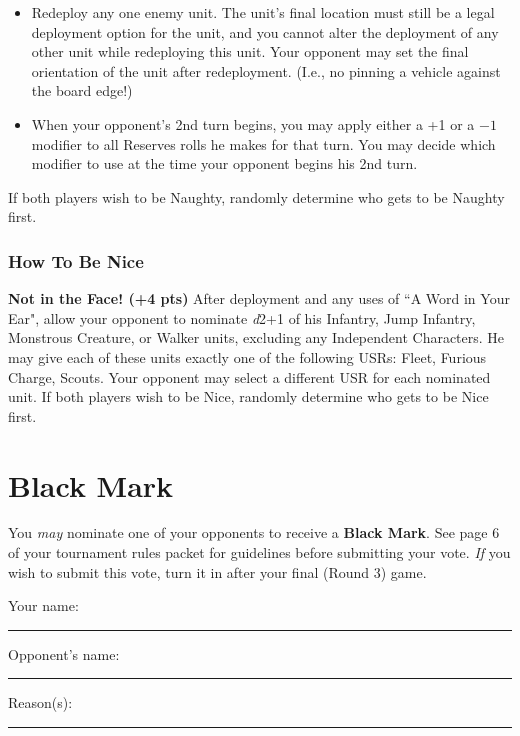 \documentclass[12pt,titlepage]{article}
\newcommand{\paragraphsmall}[1]{\noindent\textbf{#1}\quad}
\begin{document}
{\begin{itemize}
\item Redeploy any one enemy unit. The unit's final location must still be a legal deployment option for the unit, and you cannot alter the deployment of any other unit while redeploying this unit. Your opponent may set the final orientation of the unit after redeployment. (I.e., no pinning a vehicle against the board edge!)
\item When your opponent's 2nd turn begins, you may apply either a +1 or a $-1$ modifier to all Reserves rolls he makes for that turn. You may decide which modifier to use at the time your opponent begins his 2nd turn.
\end{itemize}

If both players wish to be Naughty, randomly determine who gets to be Naughty first.

\subsubsection*{How To Be Nice}
\paragraphsmall{Not in the Face! (+4 pts)} After deployment and any uses of ``A Word in Your Ear", allow your opponent to nominate \textit{d}2+1 of his Infantry, Jump Infantry, Monstrous Creature, or Walker units, excluding any Independent Characters. He may give each of these units exactly one of the following USRs: Fleet, Furious Charge, Scouts. Your opponent may select a different USR for each nominated unit. If both players wish to be Nice, randomly determine who gets to be Nice first.
}

\newpage

\pagestyle{empty}
\section*{Black Mark}

You \textit{may} nominate one of your opponents to receive a \textbf{Black Mark}. See page 6 of your tournament rules packet for guidelines before submitting your vote. \textit{If} you wish to submit this vote, turn it in after your final (Round 3) game.

\vspace{24pt}

\noindent Your name: \rule{1.8in}{.5pt}\hspace{.5in}Opponent's name: \rule{1.8in}{.5pt}

\vspace{12pt}
\noindent Reason(s): \rule{5.7in}{.5pt}
\end{document}
